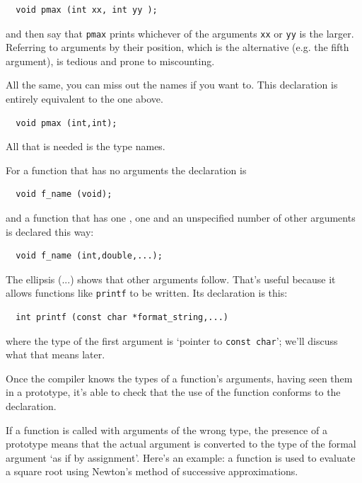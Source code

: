 \begin{Verbatim}
  void pmax (int xx, int yy );
\end{Verbatim}

   and then say that \texttt{pmax} prints whichever of the arguments
    \texttt{xx} or \texttt{yy} is the larger. Referring to arguments
    by their position, which is the alternative (e.g. the fifth argument),
    is tedious and prone to miscounting.


   All the same, you can miss out the names if you want to. This
    declaration is entirely equivalent to the one above.

\begin{Verbatim}
  void pmax (int,int);
\end{Verbatim}

   All that is needed is the type names.


   For a function that has no arguments the declaration is

\begin{Verbatim}
  void f_name (void);
\end{Verbatim}

   and a function that has one \kint, one \double{}
    and an unspecified number of other arguments is declared this way:

\begin{Verbatim}
  void f_name (int,double,...);
\end{Verbatim}

   The ellipsis (...) shows that other arguments follow. That's useful
    because it allows functions like \texttt{printf} to be written. Its
    declaration is this:

\begin{Verbatim}
  int printf (const char *format_string,...)
\end{Verbatim}

   where the type of the first argument is `pointer to \texttt{const
     char}'; we'll discuss what that means later.


   Once the compiler knows the types of a function's arguments, having
    seen them in a prototype, it's able to check that the use of the
    function conforms to the declaration.


   If a function is called with arguments of the wrong type, the presence
    of a prototype means that the actual argument is converted to the type
    of the formal argument `as if by assignment'. Here's an example: a
    function is used to evaluate a square root using Newton's method of
    successive approximations.


